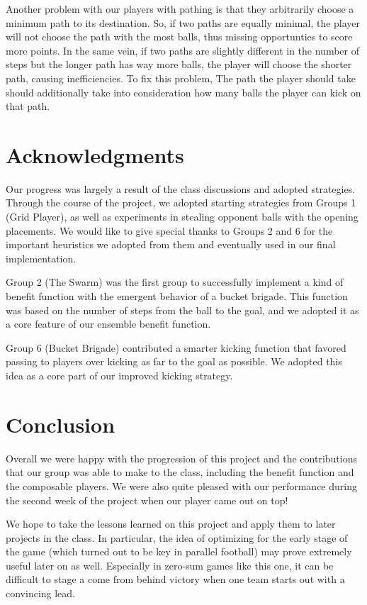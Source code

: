 \documentclass[
10pt, %
letterpaper, %
oneside, %
headinclude,footinclude, %
english
]{article}
\begin{document}
Another problem with our players with pathing is that they arbitrarily choose a minimum path to its destination. So, if two paths are equally minimal, the player will not choose the path with the most balls, thus missing opportunties to score more points. In the same vein, if two paths are slightly different in the number of steps but the longer path has way more balls, the player will choose the shorter path, causing inefficiencies. To fix this problem, The path the player should take should additionally take into consideration how many balls the player can kick on that path.

\section{Acknowledgments}

Our progress was largely a result of the class discussions and adopted strategies. Through the course of the project, we adopted starting strategies from Groups 1 (Grid Player), as well as experiments in stealing opponent balls with the opening placements. We would like to give special thanks to Groups 2 and 6 for the important heuristics we adopted from them and eventually used in our final implementation. 

Group 2 (The Swarm) was the first group to successfully implement a kind of benefit function with the emergent behavior of a bucket brigade. This function was based on the number of steps from the ball to the goal, and we adopted it as a core feature of our ensemble benefit function.

Group 6 (Bucket Brigade) contributed a smarter kicking function that favored passing to players over kicking as far to the goal as possible. We adopted this idea as a core part of our improved kicking strategy.

\section{Conclusion}

Overall we were happy with the progression of this project and the contributions that our group was able to make to the class, including the benefit function and the composable players. We were also quite pleased with our performance during the second week of the project when our player came out on top!

We hope to take the lessons learned on this project and apply them to later projects in the class. In particular, the idea of optimizing for the early stage of the game (which turned out to be key in parallel football) may prove extremely useful later on as well. Especially in zero-sum games like this one, it can be difficult to stage a come from behind victory when one team starts out with a convincing lead.
\end{document}
